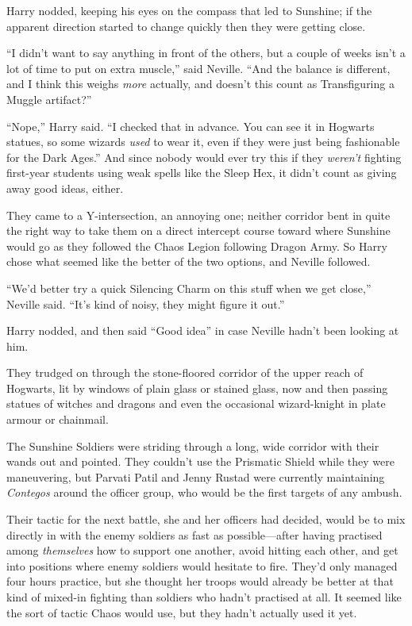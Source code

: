 Harry nodded, keeping his eyes on the compass that led to Sunshine; if the apparent direction started to change quickly then they were getting close.

“I didn’t want to say anything in front of the others, but a couple of weeks isn’t a lot of time to put on extra muscle,” said Neville. “And the balance is different, and I think this weighs \emph{more} actually, and doesn’t this count as Transfiguring a Muggle artifact?”

“Nope,” Harry said. “I checked that in advance. You can see it in Hogwarts statues, so some wizards \emph{used} to wear it, even if they were just being fashionable for the Dark Ages.” And since nobody would ever try this if they \emph{weren’t} fighting first-year students using weak spells like the Sleep Hex, it didn’t count as giving away good ideas, either.

They came to a Y-intersection, an annoying one; neither corridor bent in quite the right way to take them on a direct intercept course toward where Sunshine would go as they followed the Chaos Legion following Dragon Army. So Harry chose what seemed like the better of the two options, and Neville followed.

“We’d better try a quick Silencing Charm on this stuff when we get close,” Neville said. “It’s kind of noisy, they might figure it out.”

Harry nodded, and then said “Good idea” in case Neville hadn’t been looking at him.

They trudged on through the stone-floored corridor of the upper reach of Hogwarts, lit by windows of plain glass or stained glass, now and then passing statues of witches and dragons and even the occasional wizard-knight in plate armour or chainmail.

\later

The Sunshine Soldiers were striding through a long, wide corridor with their wands out and pointed. They couldn’t use the Prismatic Shield while they were maneuvering, but Parvati Patil and Jenny Rustad were currently maintaining \emph{Contegos} around the officer group, who would be the first targets of any ambush.

Their tactic for the next battle, she and her officers had decided, would be to mix directly in with the enemy soldiers as fast as possible—after having practised among \emph{themselves} how to support one another, avoid hitting each other, and get into positions where enemy soldiers would hesitate to fire. They’d only managed four hours practice, but she thought her troops would already be better at that kind of mixed-in fighting than soldiers who hadn’t practised at all. It seemed like the sort of tactic Chaos would use, but they hadn’t actually used it yet.

